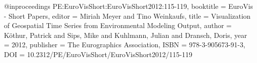 @inproceedings {PE:EuroVisShort:EuroVisShort2012:115-119,
booktitle = {EuroVis - Short Papers},
editor = {Miriah Meyer and Tino Weinkaufs},
title = {{Visualization of Geospatial Time Series from Environmental Modeling Output}},
author = {Köthur, Patrick and Sips, Mike and Kuhlmann, Julian and Dransch, Doris},
year = {2012},
publisher = {The Eurographics Association},
ISBN = {978-3-905673-91-3},
DOI = {10.2312/PE/EuroVisShort/EuroVisShort2012/115-119}
}